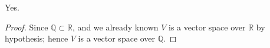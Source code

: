 \begin{Exercise}
\begin{answer}
Yes.
\end{answer}
\begin{proof}
Since $\mathbb{Q}\subset \mathbb{R}$, and we already known $V$ is a vector space over $\mathbb{R}$ by hypothesis; hence $V$ is a vector space over $\mathbb{Q}$.
\end{proof}
\end{Exercise}